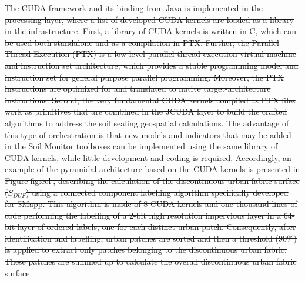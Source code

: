 \documentclass[APA,LATO1COL,doublespace]{WileyNJD-v2}
\providecommand{\DIFdeltex}[1]{{\protect\color{red}\sout{#1}}}                      %
\providecommand{\DIFdelFL}[1]{\DIFdel{#1}} %
\providecommand{\DIFdel}[1]{\texorpdfstring{\DIFdeltex{#1}}{}} %
\begin{document}
\DIFdel{The CUDA framework and its binding from Java is implemented in the processing layer, where a list of developed CUDA kernels are loaded as a library in the infrastructure. 
First, a library of CUDA kernels is written in C, which can be used both standalone and as a compilation in PTX. 
Further, the Parallel Thread Execution (PTX) is a low-level parallel thread execution virtual machine and instruction set architecture, which provides a stable programming model and instruction set for general purpose parallel programming. 
Moreover, the PTX instructions are optimized for and translated to native target-architecture instructions. 
Second, the very fundamental CUDA kernels compiled as PTX files work as primitives that are combined in the JCUDA layer to build the crafted algorithms to address the soil sealing geospatial calculations. 
The advantage of this type of orchestration is that new models and indicators that may be added in the Soil Monitor toolboxes can be implemented using the same library of CUDA kernels, while little development and coding is required.
Accordingly, an example of the pyramidal architecture based on the CUDA kernels is presented in Figure\ref{fig:ccl}, describing the calculation of the discontinuous urban fabric surface ($S_{DUF}$) using a connected component labelling algorithm specifically developed for SMapp. 
This algorithm is made of 8 CUDA kernels and one thousand lines of code performing the labelling of a 2-bit high resolution impervious layer in a 64-bit layer of ordered labels, one for each distinct urban patch.
Consequently, after identification and labelling, urban patches are sorted and then a threshold (90\%) is applied to extract only patches belonging to the discontinuous urban fabric. 
These patches are summed up to calculate the overall discontinuous urban fabric surface.
}%

\end{document}
